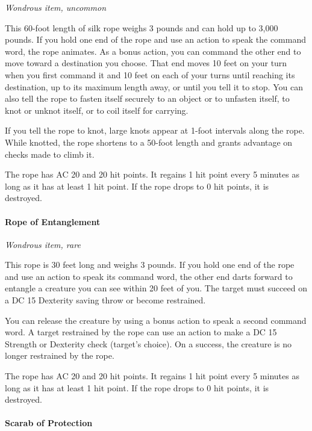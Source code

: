 \documentclass[
]{article}
\begin{document}
\emph{Wondrous item, uncommon}

This 60-foot length of silk rope weighs 3 pounds and can hold up to
3,000 pounds. If you hold one end of the rope and use an action to speak
the command word, the rope animates. As a bonus action, you can command
the other end to move toward a destination you choose. That end moves 10
feet on your turn when you first command it and 10 feet on each of your
turns until reaching its destination, up to its maximum length away, or
until you tell it to stop. You can also tell the rope to fasten itself
securely to an object or to unfasten itself, to knot or unknot itself,
or to coil itself for carrying.

If you tell the rope to knot, large knots appear at 1-foot intervals
along the rope. While knotted, the rope shortens to a 50-foot length and
grants advantage on checks made to climb it.

The rope has AC 20 and 20 hit points. It regains 1 hit point every 5
minutes as long as it has at least 1 hit point. If the rope drops to 0
hit points, it is destroyed.

\hypertarget{rope-of-entanglement}{%
\paragraph{Rope of Entanglement}\label{rope-of-entanglement}}

\emph{Wondrous item, rare}

This rope is 30 feet long and weighs 3 pounds. If you hold one end of
the rope and use an action to speak its command word, the other end
darts forward to entangle a creature you can see within 20 feet of you.
The target must succeed on a DC 15 Dexterity saving throw or become
restrained.

You can release the creature by using a bonus action to speak a second
command word. A target restrained by the rope can use an action to make
a DC 15 Strength or Dexterity check (target's choice). On a success, the
creature is no longer restrained by the rope.

The rope has AC 20 and 20 hit points. It regains 1 hit point every 5
minutes as long as it has at least 1 hit point. If the rope drops to 0
hit points, it is destroyed.

\hypertarget{scarab-of-protection}{%
\paragraph{Scarab of Protection}\label{scarab-of-protection}}
\end{document}
